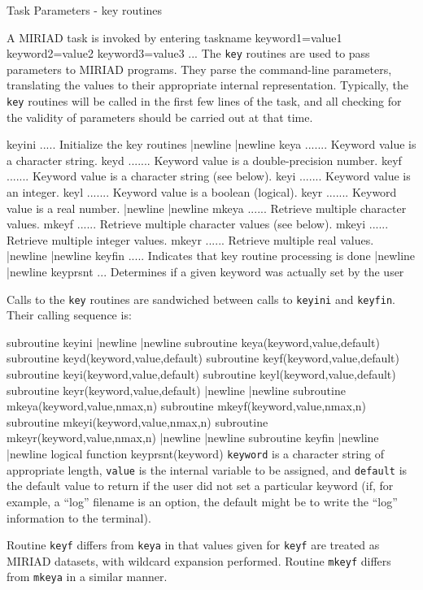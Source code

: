 \beginsection Task Parameters - key routines

A MIRIAD task is invoked by entering
{\ninepoint\begintt
taskname keyword1=value1 keyword2=value2 keyword3=value3 ...
\endtt}
The {\tt key} routines are used to pass parameters to MIRIAD programs.
They parse the command-line parameters, translating the values to their
appropriate internal representation.  Typically, the {\tt key} routines will
be called in the first few lines of the task, and all checking for the
validity of parameters should be carried out at that time.

{\ninepoint\begintt
keyini ..... Initialize the key routines |newline
   |newline 
keya ....... Keyword value is a character string.
keyd ....... Keyword value is a double-precision number.
keyf ....... Keyword value is a character string (see below).
keyi ....... Keyword value is an integer.
keyl ....... Keyword value is a boolean (logical).
keyr ....... Keyword value is a real number. |newline
 |newline
mkeya ...... Retrieve multiple character values.
mkeyf ...... Retrieve multiple character values (see below).
mkeyi ...... Retrieve multiple integer values.
mkeyr ...... Retrieve multiple real values. |newline 
   |newline
keyfin ..... Indicates that key routine processing is done |newline 
   |newline 
keyprsnt ... Determines if a given keyword was actually set by the user
\endtt}

Calls to the {\tt key} routines are sandwiched between calls to {\tt keyini}
and {\tt keyfin}.  Their calling sequence is:

{\ninepoint\begintt
subroutine keyini |newline
   |newline
subroutine keya(keyword,value,default)
subroutine keyd(keyword,value,default)
subroutine keyf(keyword,value,default)
subroutine keyi(keyword,value,default)
subroutine keyl(keyword,value,default)
subroutine keyr(keyword,value,default) |newline
   |newline
subroutine mkeya(keyword,value,nmax,n)
subroutine mkeyf(keyword,value,nmax,n)
subroutine mkeyi(keyword,value,nmax,n)
subroutine mkeyr(keyword,value,nmax,n) |newline
   |newline
subroutine keyfin |newline
   |newline
logical function keyprsnt(keyword)
\endtt}
{\tt keyword} is a character string of appropriate length, {\tt value} is
the internal variable to be assigned, and {\tt default} is the default
value to return if the user did not set a particular keyword (if, for
example, a ``log'' filename is an option, the default might be to write
the ``log'' information to the terminal).

Routine {\tt keyf} differs from {\tt keya} in that values given for
{\tt keyf} are treated as MIRIAD datasets, with wildcard expansion
performed.  Routine {\tt mkeyf} differs from {\tt mkeya} in a similar
manner.

